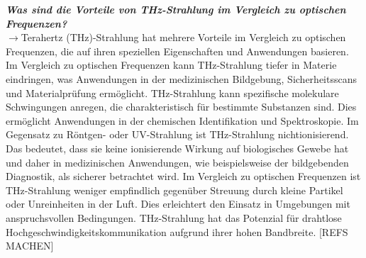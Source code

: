 \textbf{\textit{Was sind die Vorteile von THz-Strahlung im Vergleich zu optischen Frequenzen?}}\\
$\rightarrow$Terahertz (THz)-Strahlung hat mehrere Vorteile im Vergleich zu optischen Frequenzen, 
die auf ihren speziellen Eigenschaften und Anwendungen basieren. 
Im Vergleich zu optischen Frequenzen kann THz-Strahlung tiefer in Materie eindringen, 
was Anwendungen in der medizinischen Bildgebung, Sicherheitsscans und Materialprüfung ermöglicht.
THz-Strahlung kann spezifische molekulare Schwingungen anregen, die charakteristisch 
für bestimmte Substanzen sind. 
Dies ermöglicht Anwendungen in der chemischen Identifikation und Spektroskopie.
Im Gegensatz zu Röntgen- oder UV-Strahlung ist THz-Strahlung nichtionisierend. 
Das bedeutet, dass sie keine ionisierende Wirkung auf biologisches Gewebe hat 
und daher in medizinischen Anwendungen, wie beispielsweise der bildgebenden Diagnostik, 
als sicherer betrachtet wird.
Im Vergleich zu optischen Frequenzen ist THz-Strahlung weniger empfindlich gegenüber 
Streuung durch kleine Partikel oder Unreinheiten in der Luft. 
Dies erleichtert den Einsatz in Umgebungen mit anspruchsvollen Bedingungen.
THz-Strahlung hat das Potenzial für drahtlose Hochgeschwindigkeitskommunikation 
aufgrund ihrer hohen Bandbreite. [REFS MACHEN]